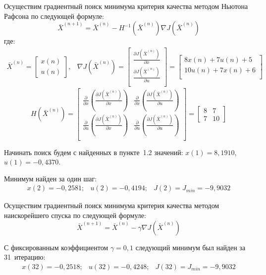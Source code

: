 \documentclass[14pt, a4paper]{extarticle}
\begin{document}
	Осуществим градиентный поиск минимума критерия качества методом Ньютона Рафсона по следующей формуле:
	$$\bar{X}^{(n+1)}=\bar{X}^{(n)}-H^{-1}(\bar{X}^{(n)})\nabla J(\bar{X}^{(n)})$$
	где:
	$$\begin{matrix}
		\bar{X}^{(n)} = 
		\left[\begin{matrix}
			x(n) \\ u(n)
		\end{matrix}\right], &
		\nabla J(\bar{X}^{(n)})= 
		\left[\begin{matrix}
			\frac{\partial J(\bar{X}^{(n)})}{\partial x} \\
			\frac{\partial J(\bar{X}^{(n)})}{\partial u} \\
		\end{matrix}\right] = 
		\left[\begin{matrix}
			8x(n)+7u(n)+5 \\
			10u(n)+7x(n)+6 \\
		\end{matrix}\right]
	\end{matrix}$$
	$$H(\bar{X}^{(n)})= 
	\left[\begin{matrix}
		\frac{\partial}{\partial x}\left(\frac{\partial J(\bar{X}^{(n)})}{\partial x}\right) &
		\frac{\partial}{\partial x}\left(\frac{\partial J(\bar{X}^{(n)})}{\partial u}\right) \\
		\frac{\partial}{\partial u}\left(\frac{\partial J(\bar{X}^{(n)})}{\partial x}\right) &
		\frac{\partial}{\partial u}\left(\frac{\partial J(\bar{X}^{(n)})}{\partial u}\right) \\
	\end{matrix}\right]=
	\left[\begin{matrix}
		8 & 7 \\ 7 & 10 
	\end{matrix}\right]$$
	
	Начинать поиск будем с найденных в пункте~1.2 значений: $x(1)=8,1910$, $u(1)=-0,4370$.
	
	Минимум найден за один шаг:
	$$\begin{matrix}
		x(2)=-0,2581; & u(2)=-0,4194; & J(2)=J_{min}=-9,9032
	\end{matrix}$$
	
	Осуществим градиентный поиск минимума критерия качества методом наискорейшего спуска по следующей формуле:
	$$\bar{X}^{(n+1)}=\bar{X}^{(n)}-\gamma\nabla J(\bar{X}^{(n)})$$
	
	С фиксированным коэффициентом $\gamma=0,1$ следующий минимум был найден за 31~итерацию:
	$$\begin{matrix}
		x(32)=-0,2518; & u(32)=-0,4248; & J(32)=J_{min}=-9,9032
	\end{matrix}$$
	
\end{document}
